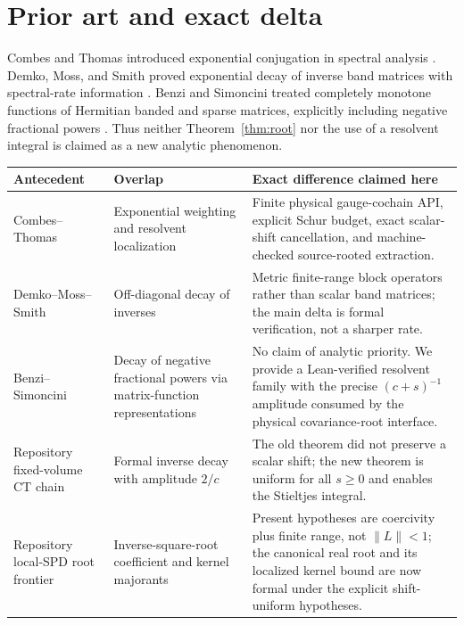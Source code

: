 \documentclass[11pt]{article}
\theoremstyle{definition}
\newcommand{\norm}[1]{\lVert #1\rVert}
\begin{document}
\section{Prior art and exact delta}\label{sec:prior}

Combes and Thomas introduced exponential conjugation in spectral analysis
\cite{CombesThomas}.  Demko, Moss, and Smith proved exponential decay of
inverse band matrices with spectral-rate information
\cite{DemkoMossSmith}.  Benzi and Simoncini treated completely monotone
functions of Hermitian banded and sparse matrices, explicitly including
negative fractional powers \cite{BenziSimoncini}.  Thus neither
Theorem~\ref{thm:root} nor the use of a resolvent integral is claimed as a new
analytic phenomenon.

\begin{center}
\small
\begin{tabular}{p{}p{}p{}}
\toprule
Antecedent & Overlap & Exact difference claimed here \\
\midrule
Combes--Thomas \cite{CombesThomas} & Exponential weighting and resolvent
localization & Finite physical gauge-cochain API, explicit Schur budget, exact
scalar-shift cancellation, and machine-checked source-rooted extraction. \\
Demko--Moss--Smith \cite{DemkoMossSmith} & Off-diagonal decay of inverses &
Metric finite-range block operators rather than scalar band matrices; the
main delta is formal verification, not a sharper rate. \\
Benzi--Simoncini \cite{BenziSimoncini} & Decay of negative fractional powers
via matrix-function representations & No claim of analytic priority.  We
provide a Lean-verified resolvent family with the precise $(c+s)^{-1}$
amplitude consumed by the physical covariance-root interface. \\
Repository fixed-volume CT chain \cite{ErikssonPoincare} & Formal inverse
decay with amplitude $2/c$ & The old theorem did not preserve a scalar shift;
the new theorem is uniform for all $s\ge0$ and enables the Stieltjes integral. \\
Repository local-SPD root frontier & Inverse-square-root coefficient and kernel
majorants & Present hypotheses are coercivity plus finite range, not
$\norm L<1$; the canonical real root and its localized kernel bound are now
formal under the explicit shift-uniform hypotheses. \\
\bottomrule
\end{tabular}
\end{center}
\end{document}
